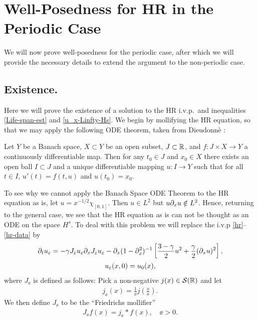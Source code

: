 \section{Well-Posedness for HR in the Periodic Case}
%
%
%
%
We will now prove well-posedness for the periodic case, after which we will
provide the necessary details to extend the argument to the non-periodic case.
\subsection{Existence.}
\label{existence}
Here we will prove the existence of a solution to the HR i.v.p.\
and inequalities
\eqref{Life-span-est} and \eqref{u_x-Linfty-Hs}.  We begin by mollifying the HR equation, so that we may apply the following ODE
theorem, taken from Dieudonn\`e \cite{Dieudonne:1969}: 
%
\begin{theorem}
\label{ode_theorem}
Let  $Y$  be a Banach space, $X\subset Y$ be an open subset,
$J \subset \mathbb{R}$, and $f: J \times X\to Y$ a continuously differentiable
map.  Then for any $t_{0} \in J$ and $x_{0} \in X$ there exists an
open ball $I \subset J$ and a unique differentiable mapping $u:I
\to Y$ such that for all $t \in I$,  $u'(t) = f(t, u)$
and $u(t_{0}) = x_{0}$.
\end{theorem}
%
To see why we cannot apply the Banach Space ODE Theorem to the HR equation as
is, let $u=x^{-1/2} \chi_{[0,1]}$. Then $u
\in L^{2}$ but $u\partial_x u \notin L^{2}$. Hence, returning to the general case, we see
that the HR equation as is can not be thought as an ODE on the space $H^s$. To
deal with this problem we will replace the i.v.p \eqref{hr}--\eqref{hr-data} by  
\begin{gather}
\label{hr-moli}
\partial_t  u_\varepsilon =
-\gamma J_\varepsilon u_\varepsilon \partial_x  J_\varepsilon  u_\varepsilon - \partial_x (1-\partial_x^2)^{-1} 
\left[\frac{3-\gamma}{2}u^2 + \frac{\gamma}{2}(\partial_x u)^2 \right],
\\
\label{hr-moli-data} 
u_\varepsilon(x, 0) = u_0 (x),
\end{gather}
%
where $J_\ee$ is defined as follows: Pick a non-negative $j(x) \in
\mathcal{S}(\mathbb{R})$ and let
\begin{equation*}
\begin{split}
j_\ee(x) = \frac{1}{\ee}j\left( \frac{x}{\ee} \right).
\end{split}
\end{equation*}
We then define $J_\ee$ to be the ``Friedrichs mollifier''
\begin{equation}
\begin{split}
J_\ee f(x) = j_\ee * f(x), \quad \ee>0.
\end{split}
\end{equation}
